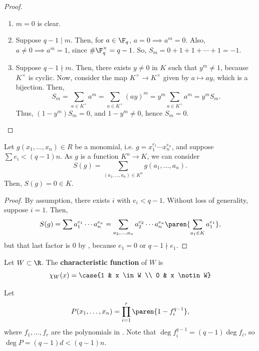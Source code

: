 \begin{proof}
    \hfill
    \begin{enumerate}[(1)]
        \item $m = 0$ is clear.
        \item Suppose $q - 1 \mid m$. Then, for $a \in \F_q$, $a = 0 \implies a^m = 0$. Also, $a \neq 0 \implies a^m = 1$, since $\# \F_q^\times = q - 1$. So, $S_m = 0 + 1 + 1 + \cdots + 1 = -1$.
        \item Suppose $q - 1 \nmid m$. Then, there exists $y \neq 0$ in $K$ such that $y^m \neq 1$, because $K^\times$ is cyclic. Now, consider the map $K^\times \to K^\times$ given by $a \mapsto ay$, which is a bijection. Then,
        $$S_m = \sum_{a \in K^\times} a^m = \sum_{a \in K^\times} (ay)^m = y^m \sum_{a \in K^\times} a^m = y^m S_m.$$
        Thus, $(1 - y^m) S_m = 0$, and $1 - y^m \neq 0$, hence $S_m = 0$.
    \end{enumerate}
\end{proof}

\begin{lem}[][label=lem:monomial-sum]
    Let $g(x_1,\dots,x_n) \in R$ be a monomial, i.e. $g = x_1^{e_1} \cdots x_n^{e_n}$, and suppose $\sum e_i < (q-1)n$. As $g$ is a function $K^n \to K$, we can consider
    $$S(g) = \sum_{(a_1,\dots,a_n) \in K^n} g(a_1,\dots,a_n).$$
    Then, $S(g) = 0 \in K$.
\end{lem}

\begin{proof}
    By assumption, there exists $i$ with $e_i < q - 1$. Without loss of generality, suppose $i = 1$. Then,
    $$S(g) = \sum a_1^{e_1} \cdots a_n^{e_n} = \sum_{a_2,\dots,a_n} a_2^{e_2} \cdots a_n^{e_n} \paren{\sum_{a_1 \in K} a_1^{e_1}},$$
    but that last factor is $0$ by , because $e_1 = 0$ or $q - 1 \nmid e_1$.
\end{proof}

\begin{ex}
    Let $W \subset \R$. The \textbf{characteristic function} of $W$ is
    $$\chi_W(x) = \case{1 & x \in W \\ 0 & x \notin W}$$
\end{ex}

\begin{defn}
    Let
    $$P(x_1,\dots,x_n) = \prod_{i=1}^r \paren{1 - f_i^{q-1}},$$
    where $f_1,\dots,f_r$ are the polynomials in . Note that $\deg f_i^{q-1} = (q-1)\deg f_i$, so $\deg P = (q-1)d < (q-1)n$.
\end{defn}

